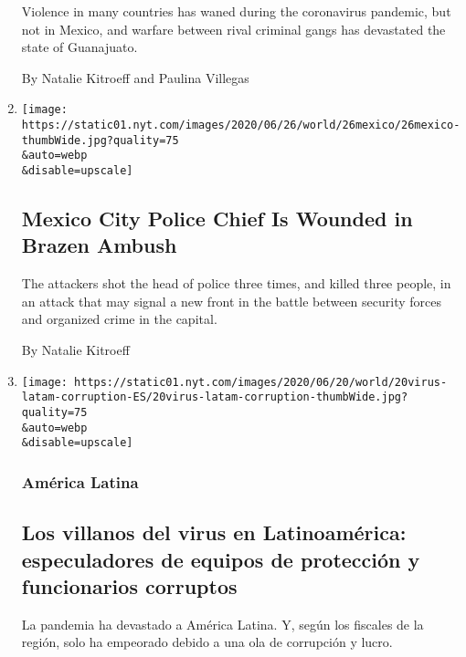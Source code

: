 \begin{enumerate}
  Violence in many countries has waned during the coronavirus pandemic,
  but not in Mexico, and warfare between rival criminal gangs has
  devastated the state of Guanajuato.

  By Natalie Kitroeff and Paulina Villegas
\item
  \href{/2020/06/26/world/americas/mexico-city-police-chief-shot.html}{}

  \texttt{[image: https://static01.nyt.com/images/2020/06/26/world/26mexico/26mexico-thumbWide.jpg?quality=75\\\&auto=webp\\\&disable=upscale]}

  \hypertarget{mexico-city-police-chief-is-wounded-in-brazen-ambush}{%
  \subsection{Mexico City Police Chief Is Wounded in Brazen
  Ambush}\label{mexico-city-police-chief-is-wounded-in-brazen-ambush}}

  The attackers shot the head of police three times, and killed three
  people, in an attack that may signal a new front in the battle between
  security forces and organized crime in the capital.

  By Natalie Kitroeff
\item
  \href{/es/2020/06/20/espanol/america-latina/corrupcion-coronavirus-latinoamerica.html}{}

  \texttt{[image: https://static01.nyt.com/images/2020/06/20/world/20virus-latam-corruption-ES/20virus-latam-corruption-thumbWide.jpg?quality=75\\\&auto=webp\\\&disable=upscale]}

  \hypertarget{amuxe9rica-latina}{%
  \subsubsection{América Latina}\label{amuxe9rica-latina}}

  \hypertarget{los-villanos-del-virus-en-latinoamuxe9rica-especuladores-de-equipos-de-protecciuxf3n-y-funcionarios-corruptos}{%
  \subsection{Los villanos del virus en Latinoamérica: especuladores de
  equipos de protección y funcionarios
  corruptos}\label{los-villanos-del-virus-en-latinoamuxe9rica-especuladores-de-equipos-de-protecciuxf3n-y-funcionarios-corruptos}}

  La pandemia ha devastado a América Latina. Y, según los fiscales de la
  región, solo ha empeorado debido a una ola de corrupción y lucro.


\end{enumerate}
